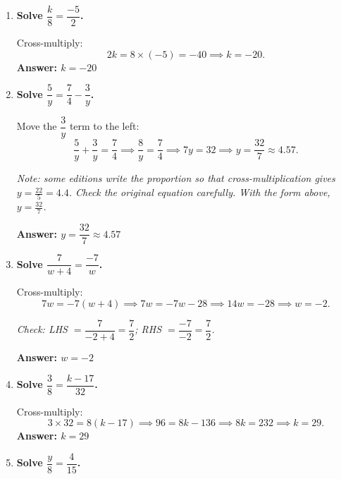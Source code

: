 \documentclass[11pt]{article}
\begin{document}
\begin{enumerate}[leftmargin=*, label=\textbf{\arabic*.}]

\item \textbf{Solve $\dfrac{k}{8} = \dfrac{-5}{2}$.}

  Cross-multiply:
  \[
    2k = 8 \times (-5) = -40 \implies k = -20.
  \]
  \textbf{Answer: $k = -20$}

\vspace{0.3cm}
\item \textbf{Solve $\dfrac{5}{y} = \dfrac{7}{4} - \dfrac{3}{y}$.}

  Move the $\dfrac{3}{y}$ term to the left:
  \[
    \frac{5}{y} + \frac{3}{y} = \frac{7}{4}
    \implies \frac{8}{y} = \frac{7}{4}
    \implies 7y = 32
    \implies y = \frac{32}{7} \approx 4.57.
  \]

  \textit{Note: some editions write the proportion so that cross-multiplication
  gives $y = \tfrac{22}{5} = 4.4$. Check the original equation carefully.
  With the form above, $y = \tfrac{32}{7}$.}

  \textbf{Answer: $y = \dfrac{32}{7} \approx 4.57$}

\vspace{0.3cm}
\item \textbf{Solve $\dfrac{7}{w+4} = \dfrac{-7}{w}$.}

  Cross-multiply:
  \[
    7w = -7(w+4) \implies 7w = -7w - 28 \implies 14w = -28 \implies w = -2.
  \]

  \textit{Check: LHS $= \dfrac{7}{-2+4} = \dfrac{7}{2}$;\quad
  RHS $= \dfrac{-7}{-2} = \dfrac{7}{2}$. \checkmark}

  \textbf{Answer: $w = -2$}

\vspace{0.3cm}
\item \textbf{Solve $\dfrac{3}{8} = \dfrac{k-17}{32}$.}

  Cross-multiply:
  \[
    3 \times 32 = 8(k - 17) \implies 96 = 8k - 136 \implies 8k = 232 \implies k = 29.
  \]
  \textbf{Answer: $k = 29$}

\vspace{0.3cm}
\item \textbf{Solve $\dfrac{y}{8} = \dfrac{4}{15}$.}


\end{enumerate}
\end{document}
